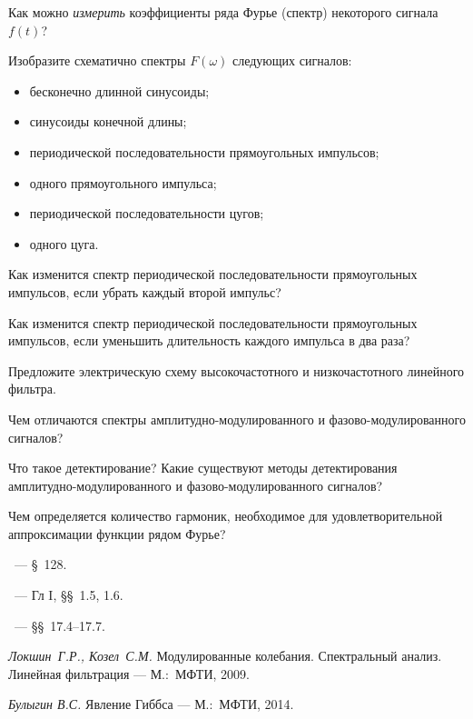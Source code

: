 \begin{lab:questions}
\item Как можно \emph{измерить} коэффициенты ряда Фурье (спектр) некоторого сигнала
$f(t)$?

\item Изобразите схематично спектры $F(\omega)$ следующих сигналов:
\begin{itemize}
    \item бесконечно длинной синусоиды;
    \item синусоиды конечной длины;
    \item периодической последовательности прямоугольных импульсов;
    \item одного прямоугольного импульса;
    \item периодической последовательности цугов;
    \item одного цуга.
\end{itemize}

\item Как изменится спектр периодической последовательности
прямоугольных импульсов, если убрать каждый второй импульс?

\item Как изменится спектр периодической последовательности прямоугольных
импульсов, если уменьшить длительность каждого импульса в два раза?

\item Предложите электрическую схему высокочастотного и 
низкочастотного линейного фильтра.

\item Чем отличаются спектры амплитудно-модулированного 
и фазово-модулированного сигналов?

\item Что такое детектирование? Какие существуют методы детектирования
амплитудно-модулированного и фазово-модулированного сигналов?

\item Чем определяется количество гармоник, необходимое для удовлетворительной 
аппроксимации функции рядом Фурье?
\end{lab:questions}


\begin{lab:literature}
    \item \SivuhinIII~--- \S~128.
    \item \KingLokOlh~--- Гл I, \S\S~1.5, 1.6.
    \item \Kirichenko~--- \S\S~17.4--17.7.
    \item \textit{Локшин~Г.Р., Козел~С.М.} Модулированные колебания. Спектральный
анализ. Линейная фильтрация --- М.:~МФТИ, 2009.
\item *\textit{Булыгин В.С.} Явление Гиббса --- М.:~МФТИ, 2014.
\end{lab:literature}




